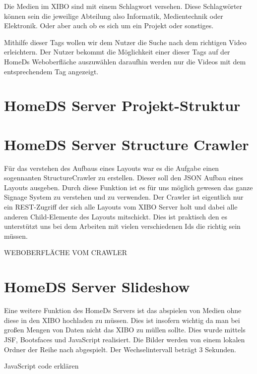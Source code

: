 Die Medien im XIBO sind mit einem Schlagwort versehen. Diese Schlagwörter können sein die jeweilige Abteilung also Informatik, Medientechnik oder Elektronik. Oder aber auch ob es sich um ein Projekt oder sonstiges. 

Mithilfe dieser Tags wollen wir dem Nutzer die Suche nach dem richtigen Video erleichtern. Der Nutzer bekommt die Möglichkeit einer dieser Tags auf der HomeDs Weboberfläche auszuwählen daraufhin werden nur die Videos mit dem entsprechendem Tag angezeigt.


\section{HomeDS Server Projekt-Struktur}\label{sec:javaeestruktur}


\section{HomeDS Server Structure Crawler}\label{sec:javaeestructurecrawler}
Für das verstehen des Aufbaus eines Layouts war es die Aufgabe einen sogennanten StructureCrawler zu erstellen. Dieser soll den JSON Aufbau eines Layouts ausgeben. Durch diese Funktion ist es für uns möglich gewesen das ganze Signage System zu verstehen und zu verwenden. Der Crawler ist eigentlich nur ein REST-Zugriff der sich alle Layouts vom XIBO Server holt und dabei alle anderen Child-Elemente des Layouts mitschickt. Dies ist praktisch den es unterstützt uns bei dem Arbeiten mit vielen verschiedenen Ids die richtig sein müssen.

WEBOBERFLÄCHE VOM CRAWLER

\section{HomeDS Server Slideshow}\label{sec:homedsslideshow}
Eine weitere Funktion des HomeDs Servers ist das abspielen von Medien ohne diese in den XIBO hochladen zu müssen. Dies ist insofern wichtig da man bei großen Mengen von Daten nicht das XIBO zu müllen sollte. Dies wurde mittels JSF, Bootsfaces und JavaScript realisiert. Die Bilder werden von einem lokalen Ordner der Reihe nach abgespielt. Der Wechselintervall beträgt 3 Sekunden.

JavaScript	code erklären
